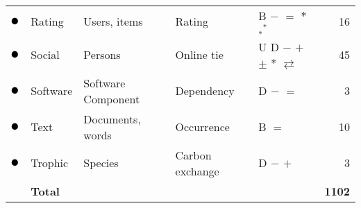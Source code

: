 \begin{tabular}{lllllr}
\textcolor{colorRating}{$\newmoon$} &Rating & Users, items & Rating & \phantom{U} \phantom{D} B $-$ $=$ \phantom{$+$} \phantom{$\pm$} \phantom{$\stackrel{+}{=}$} $*$ $_*{}^*$ \phantom{$\rightleftarrows$} \phantom{$++$}  &  16\\
\textcolor{colorSocial}{$\newmoon$} &Social & Persons & Online tie & U D \phantom{B} $-$ \phantom{$=$} $+$ $\pm$ \phantom{$\stackrel{+}{=}$} $*$ \phantom{$_*{}^*$} $\rightleftarrows$ \phantom{$++$}  &  45\\
\textcolor{colorSoftware}{$\newmoon$} &Software & Software Component & Dependency & \phantom{U} D \phantom{B} $-$ $=$ \phantom{$+$} \phantom{$\pm$} \phantom{$\stackrel{+}{=}$} \phantom{$*$} \phantom{$_*{}^*$} \phantom{$\rightleftarrows$} \phantom{$++$}  &  3\\
\textcolor{colorText}{$\newmoon$} &Text & Documents, words & Occurrence & \phantom{U} \phantom{D} B \phantom{$-$} $=$ \phantom{$+$} \phantom{$\pm$} \phantom{$\stackrel{+}{=}$} \phantom{$*$} \phantom{$_*{}^*$} \phantom{$\rightleftarrows$} \phantom{$++$}  &  10\\
\textcolor{colorTrophic}{$\newmoon$} &Trophic & Species & Carbon exchange & \phantom{U} D \phantom{B} $-$ \phantom{$=$} $+$ \phantom{$\pm$} \phantom{$\stackrel{+}{=}$} \phantom{$*$} \phantom{$_*{}^*$} \phantom{$\rightleftarrows$} \phantom{$++$}  &  3\\
\midrule
& \textbf{Total} &&&& \textbf{1102}\\
\bottomrule
\end{tabular}
